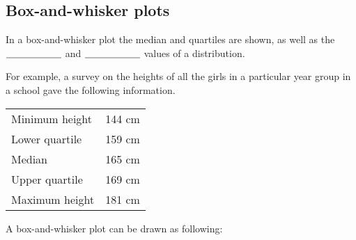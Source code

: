 \newpage

\subsection{Box-and-whisker plots}

In a box-and-whisker plot the median and quartiles are shown, as well as the $\underline{\hspace{2 cm}}$ and $\underline{\hspace{2 cm}}$ values of a distribution.

\medskip

For example, 	a survey on the heights of all the girls in a particular year group 	in a school gave the following information.

\begin{tabular}{lc}
	Minimum height  & 144 cm  \\
	Lower quartile~ & 159 cm  \\
	Median~         & 165 cm  \\
	Upper quartile~ & 169 cm  \\
	Maximum height  & 181 cm 
\end{tabular}

A box-and-whisker plot can be drawn as following:

